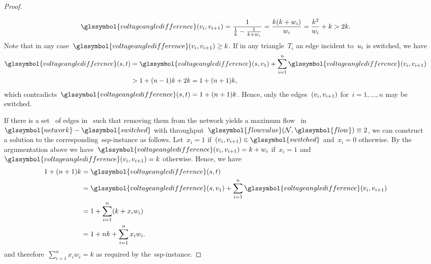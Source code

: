 \begin{proof}
\begin{figure}[tb!]
\end{figure}
 \begin{align*}
  \glssymbol{voltageangledifference}(\vertex_i,\vertex_{i+1})
   = \frac{1}{\frac{1}{k} - \frac{1}{k+w_i}}
   = \frac{k(k+w_i)}{w_i}
   = \frac{k^2}{w_i} + k
   > 2k.
 \end{align*}
 Note that in any
 case~$\glssymbol{voltageangledifference}(\vertexb_i,\vertexb_{i+1})\geq k$. If
 in any triangle~$T_i$ an edge incident to~$u_i$ is switched, we have
 \begin{align*}
  \glssymbol{voltageangledifference}(\source,\sink)
  &= \glssymbol{voltageangledifference}(\source,v_1) + \sum_{i=1}^n 
  \glssymbol{voltageangledifference}(\vertex_i,\vertex_{i+1}) \\
  &> 1 + (n-1)k + 2k
  = 1+ (n+1)k,
 \end{align*}
 which contradicts~$\glssymbol{voltageangledifference}(\source,\sink)=1+(n+1)k$.
 Hence, only the edges~$(v_i,v_{i+1})$ for~$i=1,\dots,n$ may be
 switched.
 
 If there is a set~ of edges in~ such
 that removing them from the network yields a maximum flow~
 in~$\glssymbol{network}-\glssymbol{switched}$ with
 throughput~$\glssymbol{flowvalue}(\network, \glssymbol{flow}) \equiv 2$, we can
 construct a solution to the corresponding~\gls{ssp}-instance as follows.
 Let~$x_i = 1$ if~$(v_i,v_{i+1})\in
 \glssymbol{switched}$ and~$x_i=0$ otherwise. By the argumentation above we
 have~$\glssymbol{voltageangledifference}(\vertex_i,\vertexb_{i+1}) = k + w_i$
 if~$x_i = 1$ and~$\glssymbol{voltageangledifference}
 (\vertexb_i,\vertexb_{i+1})=k$ otherwise. Hence, we have
 \begin{align*}
 1+(n+1)k
 &=\glssymbol{voltageangledifference}(\source,\sink)\\
 &= \glssymbol{voltageangledifference}(\source,v_1) 
 + 
 \sum_{i=1}^n\glssymbol{voltageangledifference}(v_i,v_{i+1})\\
 &= 1 + \sum_{i=1}^n(k+x_i w_i)\\
 &= 1 + nk +\sum_{i=1}^n x_i w_i.
 \end{align*}
 and therefore~$\sum_{i=1}^n x_i w_i = k$ as required by
 the~\gls{ssp}-instance.
 

\end{proof}
